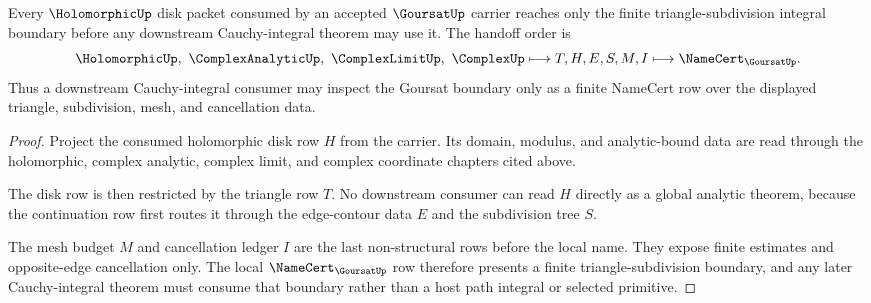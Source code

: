 \begin{theorem}
\label{thm:goursat-holomorphic-handoff}
Every $\HolomorphicUp$ disk packet consumed by an accepted $\GoursatUp$ carrier reaches only the finite triangle-subdivision integral boundary before any downstream Cauchy-integral theorem may use it. The handoff order is
$$
\HolomorphicUp,\ \ComplexAnalyticUp,\ \ComplexLimitUp,\ \ComplexUp
\longmapsto
T,H,E,S,M,I
\longmapsto
\NameCert_{\GoursatUp}.
$$
Thus a downstream Cauchy-integral consumer may inspect the Goursat boundary only as a finite NameCert row over the displayed triangle, subdivision, mesh, and cancellation data.
\end{theorem}
\begin{proof}
Project the consumed holomorphic disk row $H$ from the carrier. Its domain, modulus, and analytic-bound data are read through the holomorphic, complex analytic, complex limit, and complex coordinate chapters cited above.

The disk row is then restricted by the triangle row $T$. No downstream consumer can read $H$ directly as a global analytic theorem, because the continuation row first routes it through the edge-contour data $E$ and the subdivision tree $S$.

The mesh budget $M$ and cancellation ledger $I$ are the last non-structural rows before the local name. They expose finite estimates and opposite-edge cancellation only. The local $\NameCert_{\GoursatUp}$ row therefore presents a finite triangle-subdivision boundary, and any later Cauchy-integral theorem must consume that boundary rather than a host path integral or selected primitive.
\end{proof}


\begin{closurestatus}{\GoursatUp}
  \theoryclosure{\seedClosure}
  \formalstatus{\unformalizedV}
\end{closurestatus}
